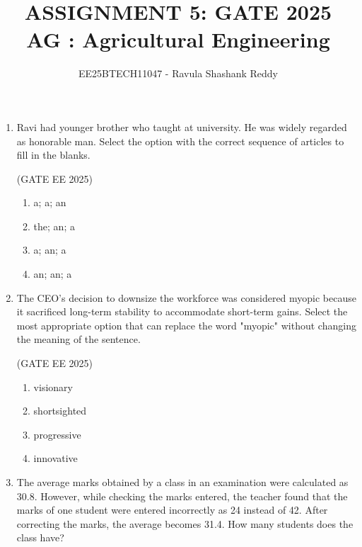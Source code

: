 \documentclass[journal,12pt,onecolumn]{IEEEtran}
\theoremstyle{remark}
\begin{document}
\title{
ASSIGNMENT 5: GATE 2025 \\
AG : Agricultural Engineering}
\author{EE25BTECH11047 - Ravula Shashank Reddy}
\maketitle
\renewcommand{\thefigure}{\theenumi}
\renewcommand{\thetable}{\theenumi}

\begin{enumerate}

\item Ravi had \underline{\hspace{2cm}} younger brother who taught at  \underline{\hspace{2cm}} university. 
He was widely regarded as \underline{\hspace{2cm}} honorable man.  
Select the option with the correct sequence of articles to fill in the blanks.

\hfill(GATE EE 2025)

\begin{multicols}{4}
\begin{enumerate}
\item a; a; an
\item the; an; a
\item a; an; a
\item an; an; a
\end{enumerate}
\end{multicols}

\item The CEO's decision to downsize the workforce was considered myopic 
because it sacrificed long-term stability to accommodate short-term gains.  
Select the most appropriate option that can replace the word "myopic"
without changing the meaning of the sentence.  

\hfill(GATE EE 2025)

\begin{multicols}{4}
\begin{enumerate}
\item visionary
\item shortsighted
\item progressive
\item innovative
\end{enumerate}
\end{multicols}

\item The average marks obtained by a class in an examination were calculated as 30.8. 
However, while checking the marks entered, the teacher found that the marks of one 
student were entered incorrectly as 24 instead of 42. After correcting the marks, 
the average becomes 31.4. How many students does the class have?


\end{enumerate}
\end{document}
